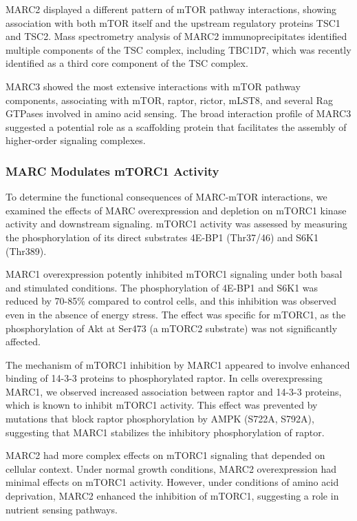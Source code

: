 \documentclass[11pt,a4paper]{article}
\begin{document}
MARC2 displayed a different pattern of mTOR pathway interactions, showing association with both mTOR itself and the upstream regulatory proteins TSC1 and TSC2. Mass spectrometry analysis of MARC2 immunoprecipitates identified multiple components of the TSC complex, including TBC1D7, which was recently identified as a third core component of the TSC complex.

MARC3 showed the most extensive interactions with mTOR pathway components, associating with mTOR, raptor, rictor, mLST8, and several Rag GTPases involved in amino acid sensing. The broad interaction profile of MARC3 suggested a potential role as a scaffolding protein that facilitates the assembly of higher-order signaling complexes.

\subsubsection{MARC Modulates mTORC1 Activity}

To determine the functional consequences of MARC-mTOR interactions, we examined the effects of MARC overexpression and depletion on mTORC1 kinase activity and downstream signaling. mTORC1 activity was assessed by measuring the phosphorylation of its direct substrates 4E-BP1 (Thr37/46) and S6K1 (Thr389).

MARC1 overexpression potently inhibited mTORC1 signaling under both basal and stimulated conditions. The phosphorylation of 4E-BP1 and S6K1 was reduced by 70-85\% compared to control cells, and this inhibition was observed even in the absence of energy stress. The effect was specific for mTORC1, as the phosphorylation of Akt at Ser473 (a mTORC2 substrate) was not significantly affected.

The mechanism of mTORC1 inhibition by MARC1 appeared to involve enhanced binding of 14-3-3 proteins to phosphorylated raptor. In cells overexpressing MARC1, we observed increased association between raptor and 14-3-3 proteins, which is known to inhibit mTORC1 activity. This effect was prevented by mutations that block raptor phosphorylation by AMPK (S722A, S792A), suggesting that MARC1 stabilizes the inhibitory phosphorylation of raptor.

MARC2 had more complex effects on mTORC1 signaling that depended on cellular context. Under normal growth conditions, MARC2 overexpression had minimal effects on mTORC1 activity. However, under conditions of amino acid deprivation, MARC2 enhanced the inhibition of mTORC1, suggesting a role in nutrient sensing pathways.
\end{document}
